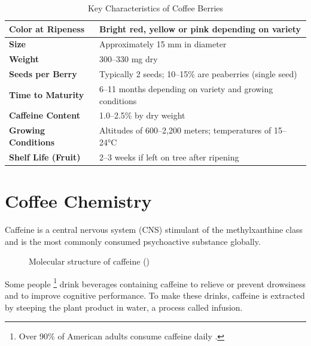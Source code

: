 \documentclass[thesis]{uofithesis} %
\begin{document}
\begin{table}[H]
    \centering
    \caption{Key Characteristics of Coffee Berries}
    \medskip
    \label{tab:coffee_characteristics}
    \renewcommand{\arraystretch}{1.5}
    \begin{tabular}{|>{\bfseries}p{2in}|p{4in}|}
        \hline
        Color at Ripeness & Bright red, yellow or pink depending on variety \\
        \hline
        Size & Approximately 15 mm in diameter \\
        \hline
        Weight & 300--330 mg dry \\
        \hline
        Seeds per Berry & Typically 2 seeds; 10--15\% are peaberries (single seed) \\
        \hline
        Time to Maturity & 6--11 months depending on variety and growing conditions \\
        \hline
        Caffeine Content & 1.0--2.5\% by dry weight \\
        \hline
        Growing Conditions & Altitudes of 600--2,200 meters; temperatures of 15--24°C \\
        \hline
        Shelf Life (Fruit) & 2--3 weeks if left on tree after ripening \\
        \hline
    \end{tabular}
\end{table}
\tagstructend

\chapter{Coffee Chemistry}

Caffeine  is a central nervous system (CNS) stimulant of the 
methylxanthine class and is the most commonly consumed psychoactive substance 
globally.

\begin{figure}[H]
    \centering
    \caption{Molecular structure of caffeine ()}
    \label{fig:caffeine_molecule}
\end{figure}
\tagstructend

Some people
\footnote{Over 90\% of American adults consume caffeine daily
\cite{SleepFoundation1}.}
drink beverages containing caffeine to relieve or prevent drowsiness and to 
improve cognitive performance. To make these drinks, caffeine is extracted by 
steeping the plant product in water, a process called infusion.
\end{document}
